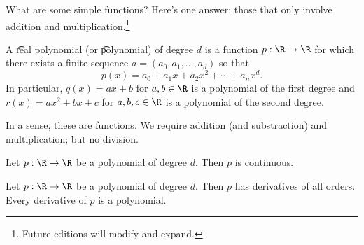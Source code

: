 

What are some simple functions?
Here's one answer: those that only involve addition and multiplication.\footnote{Future editions will modify and expand.}


A \t{real polynomial} (or \t{polynomial}) of degree $d$ is a function $p: \R \to \R$ for which there exists a finite sequence $a = (a_0, a_1, \dots, a_d)$ so that
\[
  p(x) = a_0 + a_1 x + a_2 x^2 + \cdots + a_nx^d.
\]
In particular, $q(x) = ax + b$ for $a, b \in \R$ is a polynomial of the first degree and $r(x) = ax^2 + bx + c$ for $a, b, c \in \R$ is a polynomial of the second degree.

In a sense, these are  functions.
We require addition (and substraction) and multiplication; but no division.


\begin{proposition}
  Let $p: \R \to \R$ be a polynomial of degree $d$.
  Then $p$ is continuous.
\end{proposition}

\begin{proposition}
  Let $p: \R \to \R$ be a polynomial of degree $d$.
  Then $p$ has derivatives of all orders.
  Every derivative of $p$ is a polynomial.
\end{proposition}


\blankpage
